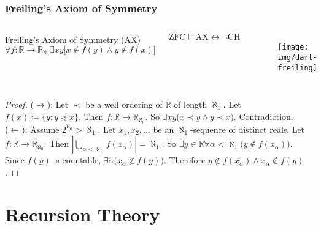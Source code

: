 \documentclass[UTF8,aspectratio=43,11pt,colorlinks,compress,openany]{beamer}%
\begin{document}
\begin{frame}\frametitle{Freiling's Axiom of Symmetry}
\begin{columns}
\begin{block}{Freiling's Axiom of Symmetry (AX)}
\[\forall f:\mathbb{R}\to\mathbb{R}_{\aleph_0}\exists xy\big[x\notin f(y)\wedge y\notin f(x)\big]\]
\end{block}
\begin{theorem}
\[\mathrm{ZFC}\vdash \mathrm{AX}\leftrightarrow\neg \mathrm{CH}\]
\end{theorem}
	\begin{figure}
		\texttt{[image: img/dart-freiling]}
	\end{figure}
\end{columns}
\begin{proof}
($\to$): Let $\prec$ be a well ordering of $\mathbb{R}$ of length $\aleph_1$. Let $f(x)\coloneqq \{y: y\preceq x\}$. Then $f:\mathbb{R}\to\mathbb{R}_{\aleph_0}$. So $\exists xy\big(x\prec y\wedge y\prec x\big)$. Contradiction.\\
($\leftarrow$): Assume $2^{\aleph_0}>\aleph_1$. Let $x_1,x_2,\dots$ be an $\aleph_1$-sequence of distinct reals. Let $f: \mathbb{R}\to\mathbb{R}_{\aleph_0}$. Then $\left|\bigcup\limits_{\alpha<\aleph_1}f(x_\alpha)\right|=\aleph_1$. So $\exists y\in\mathbb{R}\forall \alpha<\aleph_1\big(y\notin f(x_\alpha)\big)$. Since $f(y)$ is countable, $\exists \alpha\big(x_\alpha\notin f(y)\big)$. Therefore $y\notin f(x_\alpha)\wedge x_\alpha\notin f(y)$.
\end{proof}
\end{frame}


\section{Recursion Theory}
\end{document}
